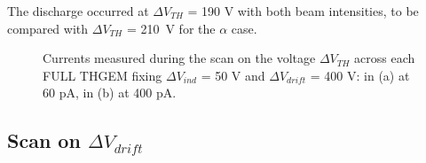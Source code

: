\documentclass[a4paper, 11 pt]{report}
\newcommand{\Vind}{$\Delta V_{ind}$}
\newcommand{\Vthgem}{$\Delta V_{TH}$}
\newcommand{\Vdrift}{$ \Delta V_{drift}$}
\begin{document}
The discharge occurred at \Vthgem{} = 190 V with both beam intensities, to be compared with 
\Vthgem{} = 210~V for the $\alpha$ case. 
\begin{figure}[!htb]
	\centering
	\caption{Currents measured during the scan on the voltage \Vthgem{} across each FULL THGEM fixing 
	\Vind{} = 50 V and \Vdrift{} = 400 V: in (a) at 60 pA, in (b) at 400 pA.}
	\label{fig:thgemScan_THGEM10_beam_10mbar}
\end{figure}
\clearpage

\subsection{Scan on \Vdrift}
\end{document}
